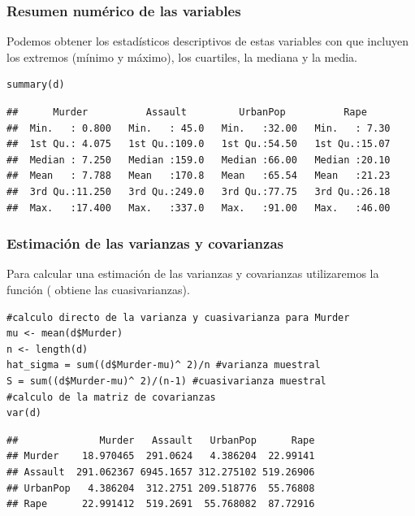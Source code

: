 \subsubsection{Resumen numérico de las variables}
Podemos obtener los estadísticos descriptivos de estas variables con  que incluyen los extremos (mínimo y máximo), los cuartiles, la mediana y la media.
\begin{lstlisting}
summary(d)
\end{lstlisting}
\begin{verbatim}
##      Murder          Assault         UrbanPop          Rape      
##  Min.   : 0.800   Min.   : 45.0   Min.   :32.00   Min.   : 7.30  
##  1st Qu.: 4.075   1st Qu.:109.0   1st Qu.:54.50   1st Qu.:15.07  
##  Median : 7.250   Median :159.0   Median :66.00   Median :20.10  
##  Mean   : 7.788   Mean   :170.8   Mean   :65.54   Mean   :21.23  
##  3rd Qu.:11.250   3rd Qu.:249.0   3rd Qu.:77.75   3rd Qu.:26.18  
##  Max.   :17.400   Max.   :337.0   Max.   :91.00   Max.   :46.00
\end{verbatim}
\subsubsection{Estimación de las varianzas y covarianzas}
Para calcular una estimación de las varianzas y covarianzas utilizaremos la función  ( obtiene las cuasivarianzas).

\begin{lstlisting}
#calculo directo de la varianza y cuasivarianza para Murder
mu <- mean(d$Murder)
n <- length(d)
hat_sigma = sum((d$Murder-mu)^ 2)/n #varianza muestral
S = sum((d$Murder-mu)^ 2)/(n-1) #cuasivarianza muestral
#calculo de la matriz de covarianzas
var(d)
\end{lstlisting}

\begin{verbatim}
##              Murder   Assault   UrbanPop      Rape
## Murder    18.970465  291.0624   4.386204  22.99141
## Assault  291.062367 6945.1657 312.275102 519.26906
## UrbanPop   4.386204  312.2751 209.518776  55.76808
## Rape      22.991412  519.2691  55.768082  87.72916
\end{verbatim}

